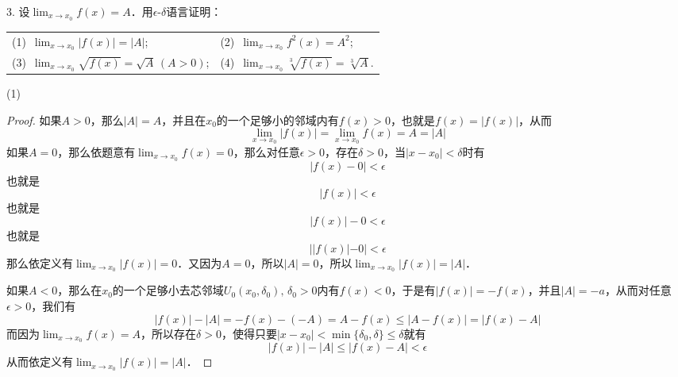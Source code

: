 3. 设$\displaystyle\lim_{x \to x_0} f(x) = A$．用$\epsilon$-$\delta$语言证明：
\begin{table}[H]
    \centering
    \begin{tabularx}{0.8\textwidth} {  >{\raggedright\arraybackslash}X >{\raggedright\arraybackslash}X  }
       (1)~$\displaystyle\lim_{x \to x_0} |f(x)| = |A|$; & (2)~$\displaystyle\lim_{x \to x_0} f^2(x)=A^2$; \\ [1em]
       (3)~$\displaystyle\lim_{x \to x_0} \sqrt{f(x)} = \sqrt{A} \, (A > 0)$; & (4)~$\displaystyle\lim_{x \to x_0} \sqrt[3]{f(x)} = \sqrt[3]{A}$.
      \end{tabularx}
\end{table}

(1) 
\begin{proof}
如果$A > 0$，那么$|A|=A$，并且在$x_0$的一个足够小的邻域内有$f(x) > 0$，也就是$f(x) = |f(x)|$，从而
\begin{equation}
    \lim_{x \to x_0} |f(x)| = \lim_{x \to x_0} f(x) = A = |A|
\end{equation}
如果$A = 0$，那么依题意有$\displaystyle\lim_{x \to x_0} f(x) = 0$，那么对任意$\epsilon > 0$，存在$\delta > 0$，当$|x - x_0| < \delta$时有
\begin{equation}
    |f(x) - 0 | < \epsilon
\end{equation}
也就是
\begin{equation}
    |f(x)| < \epsilon
\end{equation}
也就是
\begin{equation}
    |f(x)| - 0 < \epsilon
\end{equation}
也就是
\begin{equation}
    ||f(x)| - 0| < \epsilon
\end{equation}
那么依定义有$\displaystyle\lim_{x \to x_0} |f(x)| = 0$．又因为$A = 0$，所以$|A| = 0$，所以$\displaystyle\lim_{x \to x_0} |f(x)| = |A|$．

如果$A < 0$，那么在$x_0$的一个足够小去芯邻域$U_0(x_0, \delta_0), \, \delta_0 > 0$内有$f(x) < 0$，于是有$|f(x)|=-f(x)$，并且$|A|=-a$，从而对任意$\epsilon > 0$，我们有
\begin{equation}
    |f(x)| - |A| = -f(x) - (-A) = A - f(x) \leq |A - f(x)| = |f(x) - A| 
\end{equation}
而因为$\displaystyle\lim_{x \to x_0} f(x) = A$，所以存在$\delta > 0$，使得只要$|x-x_0|<\min\{\delta_0, \delta \} \leq \delta$就有
\begin{equation}
    |f(x)|-|A| \leq |f(x) - A| < \epsilon
\end{equation}
从而依定义有$\displaystyle\lim_{x \to x_0} |f(x)| = |A|$．
\end{proof}

